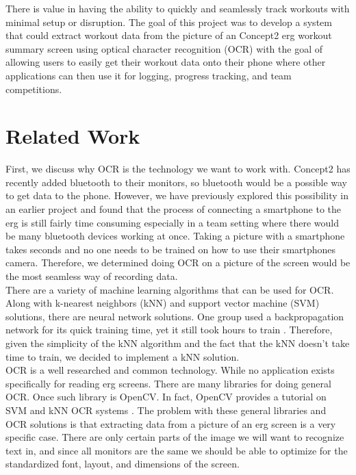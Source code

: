 \documentclass[a4paper,12pt]{article}
\begin{document}
There is value in having the ability to quickly and seamlessly track workouts with minimal setup or disruption. The goal of this project was to develop a system that could extract workout data from the picture of an Concept2 erg workout summary screen using optical character recognition (OCR) with the goal of allowing users to easily get their workout data onto their phone where other applications can then use it for logging, progress tracking, and team competitions.


\section{Related Work}
First, we discuss why OCR is the technology we want to work with. Concept2 has recently added  bluetooth to their monitors, so bluetooth would be a possible way to get data to the phone. However, we have previously explored this possibility in an earlier project and found that the process of connecting a smartphone to the erg is still fairly time consuming especially in a team setting where there would be many bluetooth devices working at once. Taking a picture with a smartphone takes seconds and no one needs to be trained on how to use their smartphones camera. Therefore, we determined doing OCR on a picture of the screen would be the most seamless way of recording data. \\

There are a variety of machine learning algorithms that can be used for OCR. Along with k-nearest neighbors (kNN) and support vector machine (SVM) solutions, there are neural network solutions. One group used a backpropagation network for its quick training time, yet it still took hours to train \cite{yeremia}. Therefore, given the simplicity of the kNN algorithm and the fact that the kNN doesn't take time to train, we decided to implement a kNN solution. \\

OCR is a well researched and common technology. While no application exists specifically for reading erg screens. There are many libraries for doing general OCR. Once such library is OpenCV.  In fact, OpenCV provides a tutorial on SVM and kNN OCR systems \cite{opencv}. The problem with these general libraries and OCR solutions is that extracting data from a picture of an erg screen is a very specific case. There are only certain parts of the image we will want to recognize text in, and since all monitors are the same we should be able to optimize for the standardized font, layout, and dimensions of the screen. \\
\end{document}

